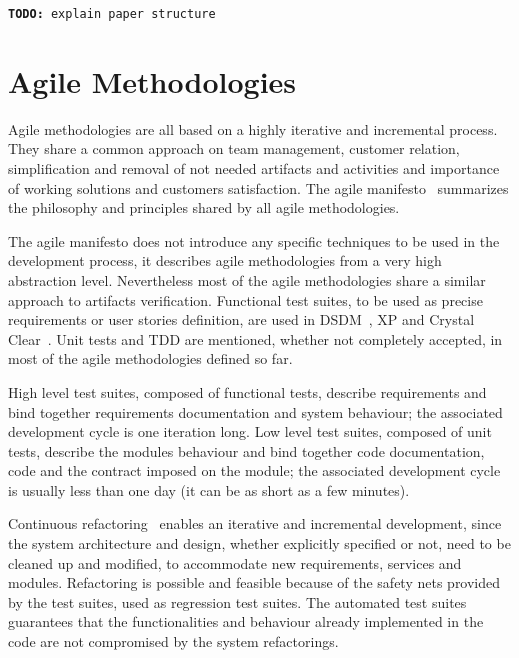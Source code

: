 \documentclass[english]{lni}
\newcommand{\todo}[1]{\texttt{\textbf{TODO:} #1}}
\begin{document}
\todo{explain paper structure}



\section{Agile Methodologies}
\label{sec:agile_methodologies}

Agile methodologies are all based on a highly iterative and incremental process.
They share a common approach on team management, customer relation, simplification and removal of not needed artifacts and activities and importance of working solutions and customers satisfaction.
The agile manifesto~\cite{Beck2001} summarizes the philosophy and principles shared by all agile methodologies.

The agile manifesto does not introduce any specific techniques to be used in the development process, it describes agile methodologies from a very high abstraction level.
Nevertheless most of the agile methodologies share a similar approach to artifacts verification.
Functional test suites, to be used as precise requirements or user stories definition, are used in DSDM~\cite{Stapleton1997}, XP and Crystal Clear~\cite{Cockburn2004}. 
Unit tests and TDD are mentioned, whether not completely accepted, in most of the agile methodologies defined so far.

High level test suites, composed of functional tests, describe requirements and bind together requirements documentation and system behaviour; the associated development cycle is one iteration long. 
Low level test suites, composed of unit tests, describe the modules behaviour and bind together code documentation, code and the contract imposed on the module; the associated development cycle is usually less than one day (it can be as short as a few minutes).

Continuous refactoring~\cite{Fowler1999} enables an iterative and incremental development, since the system architecture and design, whether explicitly specified or not, need to be cleaned up and modified, to accommodate new requirements, services and modules.
Refactoring is possible and feasible because of the safety nets provided by the test suites, used as regression test suites.
The automated test suites guarantees that the functionalities and behaviour already implemented in the code are not compromised by the system refactorings.
\end{document}

